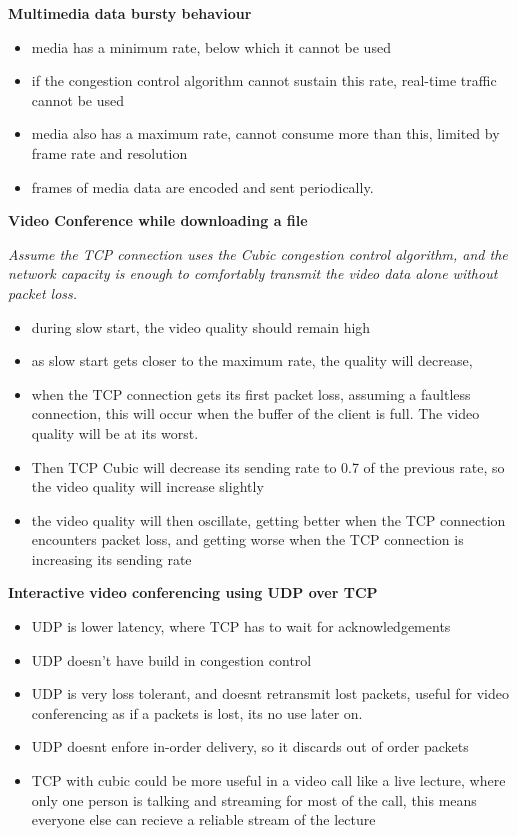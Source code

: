 \documentclass{article}
\begin{document}
\textbf{Multimedia data bursty behaviour}
\begin{itemize}
    \item media has a minimum rate, below which it cannot be used
    \item if the congestion control algorithm cannot sustain this rate, real-time traffic cannot be used
    \item media also has a maximum rate, cannot consume more than this, limited by frame rate and resolution
    \item frames of media data are encoded and sent periodically.
\end{itemize}

\clearpage

\textbf{Video Conference while downloading a file}

\textit{Assume the TCP connection uses the Cubic congestion control algorithm, and the network capacity is enough to comfortably transmit the video data alone without packet loss.}
\begin{itemize}
    \item during slow start, the video quality should remain high
    \item as slow start gets closer to the maximum rate, the quality will decrease,
    \item when the TCP connection gets its first packet loss, assuming a faultless connection, this will occur when the buffer of the client is full. The video quality will be at its worst.
    \item Then TCP Cubic will decrease its sending rate to 0.7 of the previous rate, so the video
    quality will increase slightly
    \item the video quality will then oscillate, getting better when the TCP connection encounters packet loss, and getting worse when the TCP connection is increasing its sending rate
\end{itemize}


\textbf{Interactive video conferencing using UDP over TCP}
\begin{itemize}
    \item UDP is lower latency, where TCP has to wait for acknowledgements
    \item UDP doesn't have build in congestion control
    \item UDP is very loss tolerant, and doesnt retransmit lost packets, useful for video conferencing as if a packets is lost, its no use later on.
    \item UDP doesnt enfore in-order delivery, so it discards out of order packets
    \item TCP with cubic could be more useful in a video call like a live lecture, where only one person is talking and streaming for most of the call, this means everyone else can recieve a reliable stream of the lecture
\end{itemize}
\end{document}
